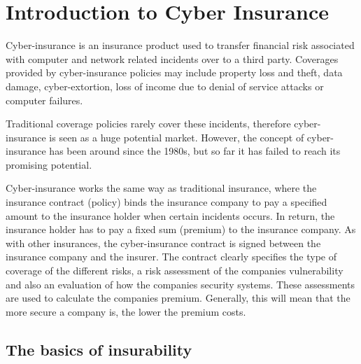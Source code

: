 \chapter{Introduction to Cyber Insurance}
\label{chp:introductionToCyberInsurance} 

Cyber-insurance is an insurance product used to transfer financial risk
associated with computer and network related incidents over to a third party.
 Coverages provided by cyber-insurance policies may include property loss and
  theft, data damage, cyber-extortion, loss of income due to denial of service attacks or computer failures. \cite{washingtonpaper}

Traditional coverage policies rarely cover these incidents, therefore 
   cyber-insurance is seen as a huge potential market. However, the concept 
   of cyber-insurance has been around since the 1980s, but so far it has failed to reach its promising potential. 
  
 
Cyber-insurance works the same way as traditional insurance, where the insurance contract (policy) binds the insurance company to pay a specified amount to the insurance holder when certain incidents occurs. In return, the insurance holder has to pay a fixed sum (premium) to the insurance company. \cite{robinson2012incentives}
    As with other insurances, the cyber-insurance contract is signed between the insurance company and the insurer. The contract clearly specifies the type of coverage of the different risks, a risk assessment of the companies vulnerability and also an evaluation of how the companies security systems. These assessments are used to calculate the companies premium. \cite{robinson2012incentives} Generally, this will mean that the more secure a company is, the lower the premium costs.  

\section{The basics of insurability}

